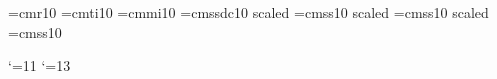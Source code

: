 


\loadeufm
%

\font\dotless=cmr10 %
\font\itdotless=cmti10
\font\mathdotless=cmmi10
\def\itumi{{\"{\itdotless\char'020}}}
\def\itumj{{\"{\itdotless\char'021}}}
\def\umi{{\"{\dotless\char'020}}}
\def\umj{{\"{\dotless\char'021}}}
\def\hati{{\^{\dotless\char'020}}}
\def\Hati{\hbox{$\hat{\imath}$}}
\def\Hatj{\hbox{$\hat{\jmath}$}}
\font\boldtitlefont=cmssdc10 scaled
\font\authorfont=cmss10 scaled
\font\sectionfont=cmss10 scaled
\font\sans=cmss10


\NoRunningHeads
{}
\loadeusm

\catcode`\@=11
\def\logo@{}
\catcode`\@=13


\newif\iffirstul

\def\ullspecial#1{\ifx\empty#1 \let\next=\relax \else
    \iffirstul\firstulfalse\else%
    \discretionary{}{}{\hbox{\ }}\fi%
$\underline{\vphantom{y}%
  \hbox{#1}}$\let\next=\ullspecial\fi 
 \next}

\def\ul#1{\firstultrue\ullspecial#1 \empty }
%
\def\undertext#1{$\underline{\vphantom{y}\hbox{#1}}$}
\def\nspace{\lineskip=1pt\baselineskip=12pt%
     \lineskiplimit=0pt}
\def\dspace{\lineskip=2pt\baselineskip=18pt%
     \lineskiplimit=0pt}

